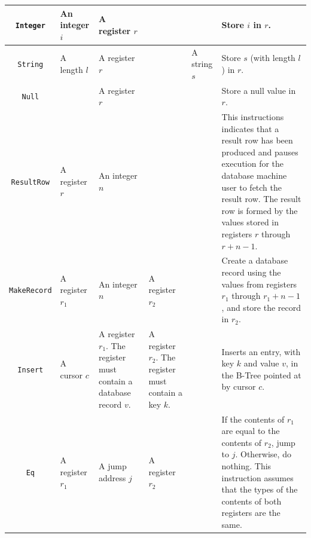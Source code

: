 \documentclass[10pt]{article}
\begin{document}
\begin{landscape}
\begin{longtable}{|c|p{3cm}|p{3cm}|p{3cm}|p{3cm}|p{4cm}|}
\texttt{Integer} & 
An integer $i$ & 
A register $r$ &
\cellcolor[gray]{0.9} &
\cellcolor[gray]{0.9} &
Store $i$ in $r$.\\\hline

\texttt{String} & 
A length $l$ & 
A register $r$ &
\cellcolor[gray]{0.9} &
A string $s$ &
Store $s$ (with length $l$) in $r$.\\\hline

\texttt{Null} & 
\cellcolor[gray]{0.9} & 
A register $r$ &
\cellcolor[gray]{0.9} &
\cellcolor[gray]{0.9} &
Store a null value in $r$.\\\hline


%
%

\texttt{ResultRow} & 
A register $r$ & 
An integer $n$ &
\cellcolor[gray]{0.9} &
\cellcolor[gray]{0.9} &
This instructions indicates that a result row has been produced and pauses execution for the database machine user to fetch the result row. The result row is formed by the values stored in registers $r$ through $r+n-1$.\\\hline

\texttt{MakeRecord} & 
A register $r_1$& 
An integer $n$ &
A register $r_2$ &
\cellcolor[gray]{0.9} &
Create a database record using the values from registers $r_1$ through $r_1+n-1$, and store the record in $r_2$.\\\hline

%
%

\texttt{Insert} & 
A cursor $c$ & 
A register $r_1$. The register must contain a database record $v$. &
A register $r_2$. The register must contain a key $k$. &
\cellcolor[gray]{0.9} &
Inserts an entry, with key $k$ and value $v$, in the B-Tree pointed at by cursor $c$.\\\hline

%
%

\texttt{Eq} & 
A register $r_1$ & 
A jump address $j$ &
A register $r_2$ &
\cellcolor[gray]{0.9} &
If the contents of $r_1$ are equal to the contents of $r_2$, jump to $j$. Otherwise, do nothing. This instruction assumes that the types of the contents of both registers are the same.\\\hline


\end{longtable}
\end{landscape}
\end{document}
